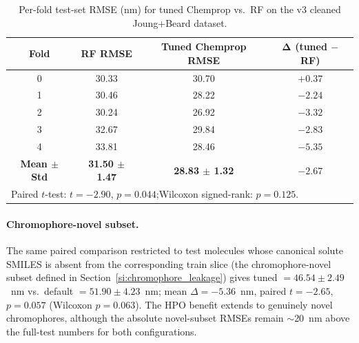 \documentclass[journal=jcisd8,manuscript=suppinfo]{achemso}
\begin{document}
\begin{table}[htbp]
\centering
\caption{Per-fold test-set RMSE (nm) for tuned Chemprop vs.\ RF on the v3 cleaned Joung+Beard dataset.}
\label{tab:si_chemprop_tuned_vs_rf}
\small
\begin{tabular}{cccc}
\toprule
\textbf{Fold} & \textbf{RF RMSE} & \textbf{Tuned Chemprop RMSE} & $\boldsymbol{\Delta}$ \textbf{(tuned $-$ RF)} \\
\midrule
0 & 30.33 & 30.70 & $+0.37$ \\
1 & 30.46 & 28.22 & $-2.24$ \\
2 & 30.24 & 26.92 & $-3.32$ \\
3 & 32.67 & 29.84 & $-2.83$ \\
4 & 33.81 & 28.46 & $-5.35$ \\
\midrule
\textbf{Mean $\pm$ Std} & \textbf{31.50 $\pm$ 1.47} & \textbf{28.83 $\pm$ 1.32} & \textbf{$-2.67$} \\
\bottomrule
\multicolumn{4}{l}{\footnotesize Paired $t$-test: $t = -2.90$, $p = 0.044$;\quad Wilcoxon signed-rank: $p = 0.125$.} \\
\end{tabular}
\end{table}

\paragraph{Chromophore-novel subset.}
The same paired comparison restricted to test molecules whose canonical solute SMILES is absent from the corresponding train slice (the chromophore-novel subset defined in Section~\ref{si:chromophore_leakage}) gives tuned $= 46.54 \pm 2.49$~nm vs.\ default $= 51.90 \pm 4.23$~nm; mean $\Delta = -5.36$~nm, paired $t = -2.65$, $p = 0.057$ (Wilcoxon $p = 0.063$). The HPO benefit extends to genuinely novel chromophores, although the absolute novel-subset RMSEs remain $\sim$20~nm above the full-test numbers for both configurations.
\end{document}
